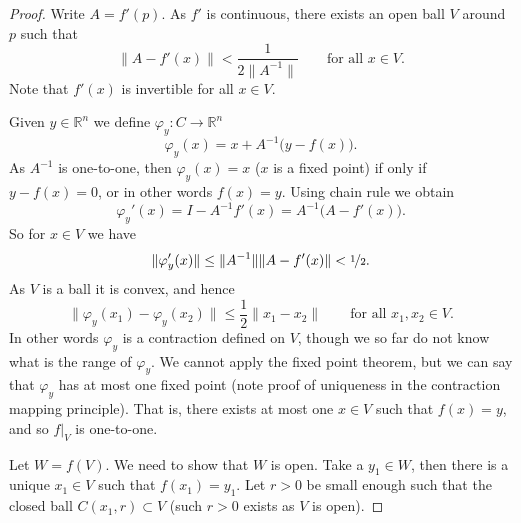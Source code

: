 \documentclass[12pt]{book}
\newcommand{\snorm}[1]{\lVert {#1} \rVert}
\newcommand{\R}{{\mathbb{R}}}
\theoremstyle{plain}
\theoremstyle{remark}
\theoremstyle{definition}
\theoremstyle{exercise}
\theoremstyle{example}
\begin{document}
\begin{proof}
Write $A = f'(p)$.  As $f'$ is continuous, there exists an open ball
$V$ around $p$ such that
\begin{equation*}
\snorm{A-f'(x)} < \frac{1}{2\snorm{A^{-1}}}
\qquad \text{for all $x \in V$.}
\end{equation*}
Note that $f'(x)$ is invertible for all $x \in V$.

Given $y \in \R^n$ we define $\varphi_y \colon C \to \R^n$
\begin{equation*}
\varphi_y (x) = x + A^{-1}\bigl(y-f(x)\bigr) .
\end{equation*}
As $A^{-1}$ is one-to-one,
then $\varphi_y(x) = x$ ($x$ is a fixed point) if only if
$y-f(x) = 0$, or in other words $f(x)=y$.  Using chain rule we obtain
\begin{equation*}
\varphi_y'(x) = I - A^{-1} f'(x) = A^{-1} \bigl( A-f'(x) \bigr) .
\end{equation*}
So for $x \in V$ we have
\begin{equation*}
\snorm{\varphi_y'(x)} \leq \snorm{A^{-1}} \snorm{A-f'(x)} < \nicefrac{1}{2} .
\end{equation*}
As $V$ is a ball it is convex, and hence
\begin{equation*}
\snorm{\varphi_y(x_1)-\varphi_y(x_2)} \leq \frac{1}{2} \snorm{x_1-x_2} 
\qquad
\text{for all $x_1,x_2 \in V$}.
\end{equation*}
In other words $\varphi_y$ is a contraction defined on $V$, though we so far
do not know what is the range of $\varphi_y$.  We cannot apply the fixed
point theorem, but we can say that $\varphi_y$ 
has at most one fixed point (note proof of uniqueness in the contraction
mapping principle).  That is, there exists at most one $x \in V$
such that $f(x) = y$, and so $f|_V$ is one-to-one.

Let $W = f(V)$.  We need to show that $W$ is open.  Take a $y_1 \in W$,
then there is a unique $x_1 \in V$ such that $f(x_1) = y_1$.
Let $r > 0$ be small enough such that the closed ball $C(x_1,r) \subset V$
(such $r > 0$ exists as $V$ is open).


\end{proof}
\end{document}
